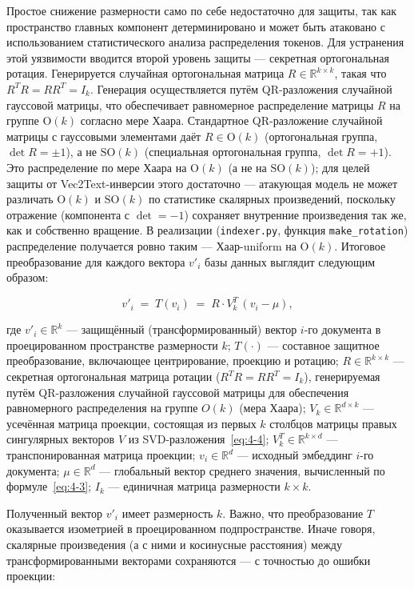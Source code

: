 \documentclass[a4paper, 12pt, oneside, openany]{article}
\begin{document}
Простое снижение размерности само по себе недостаточно для защиты, так как пространство главных компонент детерминировано и может быть атаковано с использованием статистического анализа распределения токенов. Для устранения этой уязвимости вводится второй уровень защиты --- секретная ортогональная ротация. Генерируется случайная ортогональная матрица $R \in \mathbb{R}^{k \times k}$, такая что $R^{T} R = R R^{T} = I_{k}$. Генерация осуществляется путём QR-разложения случайной гауссовой матрицы, что обеспечивает равномерное распределение матрицы $R$ на группе $\mathrm{O}(k)$ согласно мере Хаара. Стандартное QR-разложение случайной матрицы с гауссовыми элементами даёт $R \in \mathrm{O}(k)$ (ортогональная группа, $\det R = \pm 1$), а не $\mathrm{SO}(k)$ (специальная ортогональная группа, $\det R = +1$). Это распределение по мере Хаара на $\mathrm{O}(k)$ (а не на $\mathrm{SO}(k)$); для целей защиты от Vec2Text-инверсии этого достаточно --- атакующая модель не может различать $\mathrm{O}(k)$ и $\mathrm{SO}(k)$ по статистике скалярных произведений, поскольку отражение (компонента с $\det = -1$) сохраняет внутренние произведения так же, как и собственно вращение. В реализации (\texttt{indexer.py}, функция \texttt{make\_rotation}) распределение получается ровно таким --- Хаар-uniform на $\mathrm{O}(k)$. Итоговое преобразование для каждого вектора $v'_{i}$ базы данных выглядит следующим образом:

\[
v'_{i} \;=\; T(v_{i}) \;=\; R \cdot V_{k}^{T}\,(v_{i} - \mu),
\]

где $v'_{i} \in \mathbb{R}^{k}$ --- защищённый (трансформированный) вектор $i$-го документа в проецированном пространстве размерности $k$; $T(\cdot)$ --- составное защитное преобразование, включающее центрирование, проекцию и ротацию; $R \in \mathbb{R}^{k \times k}$ --- секретная ортогональная матрица ротации ($R^{T} R = R R^{T} = I_{k}$), генерируемая путём QR-разложения случайной гауссовой матрицы для обеспечения равномерного распределения на группе $O(k)$ (мера Хаара); $V_{k} \in \mathbb{R}^{d \times k}$ --- усечённая матрица проекции, состоящая из первых $k$ столбцов матрицы правых сингулярных векторов $V$ из SVD-разложения~\eqref{eq:4-4}; $V_{k}^{T} \in \mathbb{R}^{k \times d}$ --- транспонированная матрица проекции; $v_{i} \in \mathbb{R}^{d}$ --- исходный эмбеддинг $i$-го документа; $\mu \in \mathbb{R}^{d}$ --- глобальный вектор среднего значения, вычисленный по формуле~\eqref{eq:4-3}; $I_{k}$ --- единичная матрица размерности $k \times k$.

Полученный вектор $v'_{i}$ имеет размерность $k$. Важно, что преобразование $T$ оказывается изометрией в проецированном подпространстве. Иначе говоря, скалярные произведения (а с ними и косинусные расстояния) между трансформированными векторами сохраняются --- с точностью до ошибки проекции:
\end{document}
